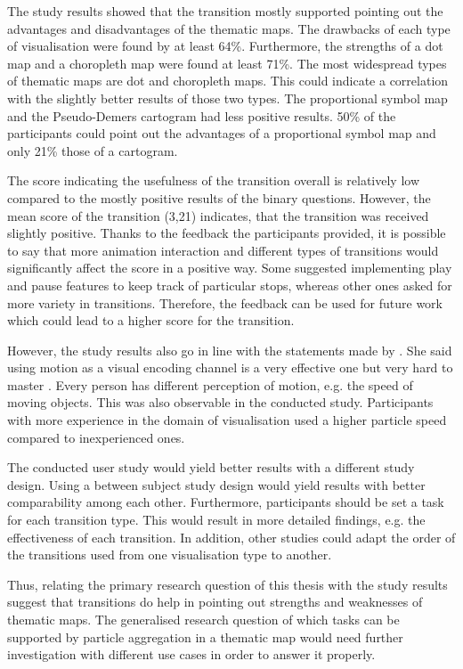 \cbstart
The study results showed that the transition mostly supported pointing out the advantages and disadvantages of the thematic maps. The drawbacks of each type of visualisation were found by at least 64\%. Furthermore, the strengths of a dot map and a choropleth map were found at least 71\%. The most widespread types of thematic maps are dot and choropleth maps. This could indicate a correlation with the slightly better results of those two types. The proportional symbol map and the Pseudo-Demers cartogram had less positive results. 50\% of the participants could point out the advantages of a proportional symbol map and only 21\% those of a cartogram.
\cbend

The score indicating the usefulness of the transition overall is relatively low compared to the mostly positive results of the binary questions. However, the mean score of the transition (3,21) indicates, that the transition was received slightly positive. Thanks to the feedback the participants provided, it is possible to say that more animation interaction and different types of transitions would significantly affect the score in a positive way. Some suggested implementing play and pause features to keep track of particular stops, whereas other ones asked for more variety in transitions. Therefore, the feedback can be used for future work which could lead to a higher score for the transition.

However, the study results also go in line with the statements made by \citeauthor{Munzner2014}. She said using motion as a visual encoding channel is a very effective one but very hard to master . Every person has different perception of motion, e.g. the speed of moving objects. This was also observable in the conducted study. Participants with more experience in the domain of visualisation used a higher particle speed compared to inexperienced ones.

\cbstart
The conducted user study would yield better results with a different study design. Using a between subject study design would yield results with better comparability among each other. Furthermore, participants should be set a task for each transition type. This would result in more detailed findings, e.g. the effectiveness of each transition. In addition, other studies could adapt the order of the transitions used from one visualisation type to another.
\cbend

Thus, relating the primary research question of this thesis with the study results suggest that transitions do help in pointing out strengths and weaknesses of thematic maps. The generalised research question of which tasks can be supported by particle aggregation in a thematic map would need further investigation with different use cases in order to answer it properly.
